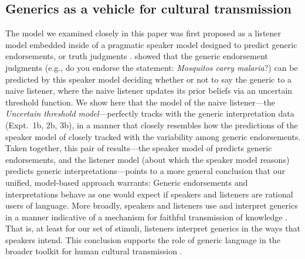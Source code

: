 \documentclass[floatsintext,doc]{apa6}
\begin{document}
\subsection{Generics as a vehicle for cultural transmission}

The model we examined closely in this paper was first proposed as a listener model embedded inside of a pragmatic speaker model designed to predict generic endorsements, or truth judgments \cite{Tessler2019psychrev}.
 showed that the generic endorsement judgments (e.g., do you endorse the statement:  \emph{Mosquitos carry malaria}?) can be predicted by this speaker model deciding whether or not to say the generic to a naive listener, where the naive listener updates its prior beliefs via an uncertain threshold function. 
We show here that the model of the naive listener---the \emph{Uncertain threshold model}---perfectly tracks with the generic interpretation data (Expt.~1b, 2b, 3b), in a manner that closely resembles how the predictions of the  speaker model of  closely tracked with the variability among generic endorsements.
Taken together, this pair of results---the speaker model of  predicts generic endorsements, and the listener model (about which the speaker model reasons) predicts generic interpretations---points to a more general conclusion that our unified, model-based approach warrants: Generic endorsements and interpretations behave as one would expect if speakers and listeners are rational users of language. 
More broadly, speakers and listeners use and interpret generics in a manner indicative of a mechanism for faithful transmission of knowledge \cite{Tomasello1999}. 
That is, at least for our set of stimuli, listeners interpret generics in the ways that speakers intend.
This conclusion supports the role of generic language in the broader toolkit for human cultural transmission \cite<see also>{tomasello2016cultural, gelman2017language}.

\end{document}
